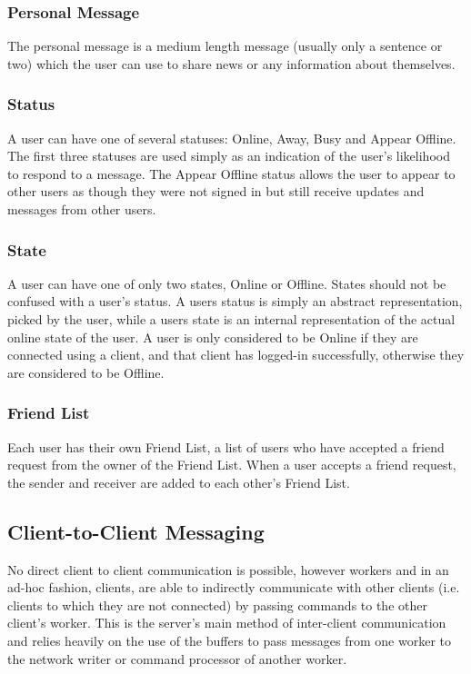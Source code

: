 \subsubsection{Personal Message}
The personal message is a medium length message (usually only a sentence or two) which the user can use to share news or any information about themselves.


\subsubsection{Status}
A user can have one of several statuses: Online, Away, Busy and Appear Offline. The first three statuses are used simply as an indication of the user's likelihood to respond to a message. The Appear Offline status allows the user to appear to other users as though they were not signed in but still receive updates and messages from other users.

\subsubsection{State}
A user can have one of only two states, Online or Offline. States should not be confused with a user's status. A users status is simply an abstract representation, picked by the user, while a users state is an internal representation of the actual online state of the user. A user is only considered to be Online if they are connected using a client, and that client has logged-in successfully, otherwise they are considered to be Offline.

\subsubsection{Friend List}
Each user has their own Friend List, a list of users who have accepted a friend request from the owner of the Friend List. When a user accepts a friend request, the sender and receiver are added to each other's Friend List.

\subsection{Client-to-Client Messaging}
\label{c2c}
No direct client to client communication is possible, however workers and in an ad-hoc fashion, clients, are able to indirectly communicate with other clients (i.e. clients to which they are not connected) by passing commands to the other client's worker. This is the server's main method of inter-client communication and relies heavily on the use of the buffers to pass messages from one worker to the network writer or command processor of another worker.

